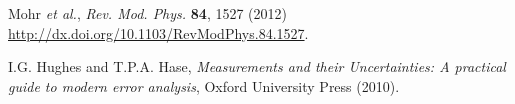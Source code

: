 \documentclass[letterpaper,11pt]{report}
\begin{document}
\begin{thebibliography}{99}
 Mohr \textit{et al.}, {\sl Rev. Mod. Phys.} {\bf 84}, 1527 (2012) \url{http://dx.doi.org/10.1103/RevModPhys.84.1527}.

 I.G. Hughes and T.P.A. Hase, \textit{Measurements and their Uncertainties: A practical guide to modern error analysis}, Oxford University Press (2010).
\end{thebibliography}
\end{document}
